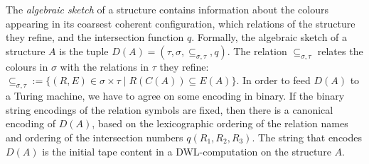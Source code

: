 \documentclass[a4paper,UKenglish,cleveref, autoref, thm-restate]{lipics-v2021}
\begin{document}
	The \emph{algebraic sketch} of a structure contains information about the colours appearing in its coarsest coherent configuration, which relations of the structure they refine, and the intersection function $q$. Formally, the algebraic sketch of a structure $A$
	is the tuple $D(A) = (\tau,\sigma, \subseteq_{\sigma,\tau},q)$. The relation $\subseteq_{\sigma,\tau}$ relates the colours in $\sigma$ with the relations in $\tau$ they refine: $\subseteq_{\sigma,\tau} := \{ (R,E) \in \sigma \times \tau \mid R(C(A)) \subseteq E(A)  \}$. 
	In order to feed $D(A)$ to a Turing machine, we have to agree on some encoding in binary. If the binary string encodings of the relation symbols are fixed, then there is a canonical encoding of $D(A)$, based on the lexicographic ordering of the relation names and ordering of the intersection numbers  $q(R_1,R_2,R_3)$. The string that encodes $D(A)$ is the initial tape content in a DWL-computation on the structure $A$.
	
\end{document}
